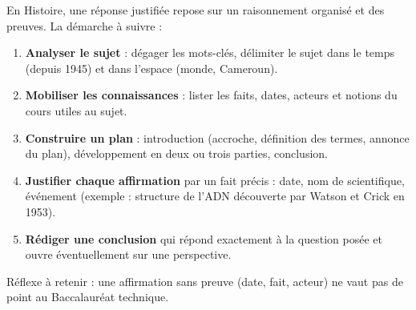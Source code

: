 \documentclass[11pt]{article}
\newcommand{\cle}[1]{{\popxbold\color{popdark}#1}}
\begin{document}
\begin{methode}
En Histoire, une réponse justifiée repose sur un raisonnement organisé et des preuves. La démarche à suivre :
\begin{enumerate}
\item \textbf{Analyser le sujet} : dégager les mots-clés, délimiter le sujet dans le temps (depuis 1945) et dans l'espace (monde, Cameroun).
\item \textbf{Mobiliser les connaissances} : lister les faits, dates, acteurs et notions du cours utiles au sujet.
\item \textbf{Construire un plan} : introduction (accroche, définition des termes, annonce du plan), développement en deux ou trois parties, conclusion.
\item \textbf{Justifier chaque affirmation} par un fait précis : date, nom de scientifique, événement (exemple : structure de l'ADN découverte par Watson et Crick en 1953).
\item \textbf{Rédiger une conclusion} qui répond exactement à la question posée et ouvre éventuellement sur une perspective.
\end{enumerate}
Réflexe à retenir : une affirmation sans \cle{preuve} (date, fait, acteur) ne vaut pas de point au Baccalauréat technique.
\end{methode}
\end{document}
